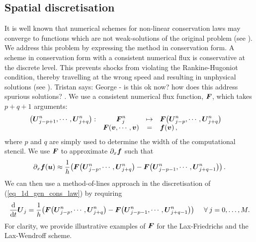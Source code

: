 \documentclass[final]{amsart}
\renewcommand{\dfunkmapstonumflux}[5]{\ensuremath{
		\begin{array}{rccl}
			{#1}: & {#2} &\mapsto&{#3}
			\\
			& {#4} &=&{#5}
		\end{array}\quad}}
\renewcommand{\vec}[1]{\geovec{#1}}
\newcommand{\tristan}[1]{{\color{purple} Tristan says:  #1 }}
\numberwithin{equation}{section}
\begin{document}
\subsection{Spatial discretisation}
It is well known that numerical schemes for non-linear conservation
laws may converge to functions which are not weak-solutions of the
original problem (see \cite[\S12.1]{leveque1992numerical}). We address
this problem by expressing the method in conservation form.  A scheme in conservation form with a consistent numerical flux  is conservative at the discrete level.  This  prevents shocks from violating the Rankine-Hugoniot condition, thereby travelling at the wrong speed and  resulting in unphysical solutions (see \cite[Thm. 4.2]{hesthaven2017numerical}).
\tristan{George - is this ok now? how does this address spurious solutions?}. We use a
consistent numerical flux function, $\vec{F}$, which takes $p+q+1$
arguments:
\begin{equation}\label{eq_defn_num_flux}
\dfunkmapstonumflux{\qp{\vec{U}^n_{j-p+1},\cdots,\vec{U}^n_{j+q}}}{\vec{F}^n_j}{{\vec{F}}\qp{\vec{U}^n_{j-p},\cdots,\vec{U}^n_{j+q}}}{\vec{F}\qp{\vec{v},\cdots,\vec{v}}}{\vec{f}\qp{\vec{v}}, }
\end{equation}
where $p$ and $q$ are simply used to determine the width of the
computational stencil.  We use $\vec{F}$ to approximate
$\partial_{x}\vec{f}$ such that
\begin{equation}\label{eq_num_approx_f}
  \partial_{x}\vec{f}\qp{\vec{u}}\approx \frac{1}{h}\qp{{\vec{F}\qp{\vec{U}^n_{j-p},\cdots,\vec{U}^n_{j+q}}}-{\vec{F}\qp{\vec{U}^n_{j-p-1},\cdots,\vec{U}^n_{j+q-1}}}}.
\end{equation}
We can then use a method-of-lines approach in the discretisation of
(\ref{eq_1d_gen_cons_law}) by requiring
\begin{equation}\label{eq_conservation_form}
  \frac{\mathrm{d}}{\mathrm{d}t}\vec{U}_j =  \frac{1}{h}\qp{{\vec{F}\qp{\vec{U}^n_{j-p},\cdots,\vec{U}^n_{j+q}}}-{\vec{F}\qp{\vec{U}^n_{j-p-1},\cdots,\vec{U}^n_{j+q-1}}}} \Foreach j=0, \dots, M.
\end{equation}
For clarity, we provide illustrative examples of $\vec{F}$ for the
Lax-Friedrichs and the Lax-Wendroff scheme. 
\end{document}
